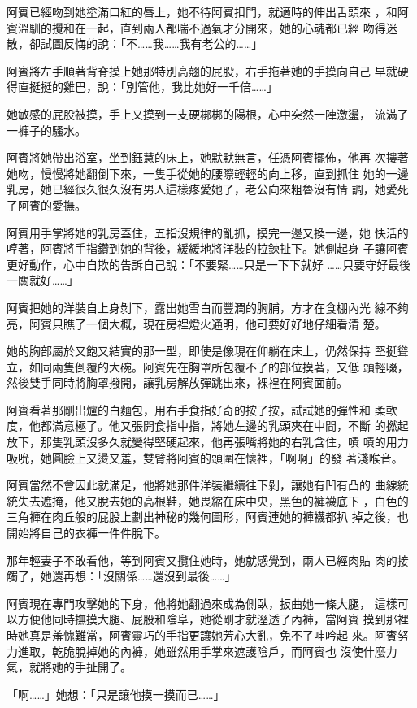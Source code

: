 阿賓已經吻到她塗滿口紅的唇上，她不待阿賓扣門，就適時的伸出舌頭來
，和阿賓溫馴的攪和在一起，直到兩人都喘不過氣才分開來，她的心魂都已經
吻得迷散，卻試圖反悔的說：「不……我……我有老公的……」

阿賓將左手順著背脊摸上她那特別高翹的屁股，右手拖著她的手摸向自己
早就硬得直挺挺的雞巴，說：「別管他，我比她好一千倍……」

她敏感的屁股被摸，手上又摸到一支硬梆梆的陽根，心中突然一陣激盪，
流滿了一褲子的騷水。

阿賓將她帶出浴室，坐到鈺慧的床上，她默默無言，任憑阿賓擺佈，他再
次摟著她吻，慢慢將她翻倒下來，一隻手從她的腰際輕輕的向上移，直到抓住
她的一邊乳房，她已經很久很久沒有男人這樣疼愛她了，老公向來粗魯沒有情
調，她愛死了阿賓的愛撫。

阿賓用手掌將她的乳房蓋住，五指沒規律的亂抓，摸完一邊又換一邊，她
快活的哼著，阿賓將手指鑽到她的背後，緩緩地將洋裝的拉鍊扯下。她側起身
子讓阿賓更好動作，心中自欺的告訴自己說：「不要緊……只是一下下就好
……只要守好最後一關就好……」

阿賓把她的洋裝自上身剝下，露出她雪白而豐潤的胸脯，方才在食棚內光
線不夠亮，阿賓只瞧了一個大概，現在房裡燈火通明，他可要好好地仔細看清
楚。

她的胸部屬於又飽又結實的那一型，即使是像現在仰躺在床上，仍然保持
堅挺聳立，如同兩隻倒覆的大碗。阿賓先在胸罩所包覆不了的部位摸著，又低
頭輕啜，然後雙手同時將胸罩撥開，讓乳房解放彈跳出來，裸裎在阿賓面前。

阿賓看著那剛出爐的白麵包，用右手食指好奇的按了按，試試她的彈性和
柔軟度，他都滿意極了。他又張開食指中指，將她左邊的乳頭夾在中間，不斷
的撚起放下，那隻乳頭沒多久就變得堅硬起來，他再張嘴將她的右乳含住，嘖
嘖的用力吸吮，她圓臉上又燙又羞，雙臂將阿賓的頭圍在懷裡，「啊啊」的發
著淺喉音。

阿賓當然不會因此就滿足，他將她那件洋裝繼續往下剝，讓她有凹有凸的
曲線統統失去遮掩，他又脫去她的高根鞋，她畏縮在床中央，黑色的褲襪底下
，白色的三角褲在肉丘般的屁股上劃出神秘的幾何圖形，阿賓連她的褲襪都扒
掉之後，也開始將自己的衣褲一件件脫下。

那年輕妻子不敢看他，等到阿賓又攬住她時，她就感覺到，兩人已經肉貼
肉的接觸了，她還再想：「沒關係……還沒到最後……」

阿賓現在專門攻擊她的下身，他將她翻過來成為側臥，扳曲她一條大腿，
這樣可以方便他同時撫摸大腿、屁股和陰阜，她從剛才就溼透了內褲，當阿賓
摸到那裡時她真是羞愧難當，阿賓靈巧的手指更讓她芳心大亂，免不了呻吟起
來。阿賓努力進取，乾脆脫掉她的內褲，她雖然用手掌來遮護陰戶，而阿賓也
沒使什麼力氣，就將她的手扯開了。

「啊……」她想：「只是讓他摸一摸而已……」


